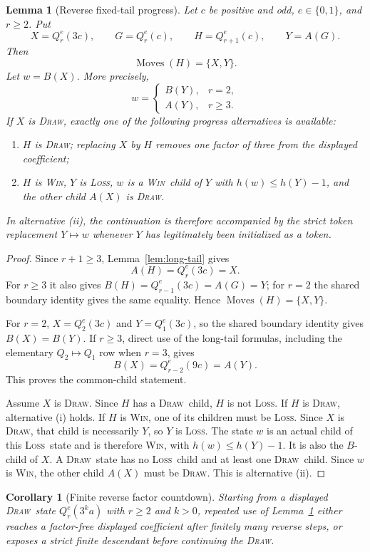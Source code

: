 \documentclass[11pt,a4paper]{article}
\newtheorem{lemma}[theorem]{Lemma}
\newtheorem{corollary}[theorem]{Corollary}
\theoremstyle{definition}
\theoremstyle{remark}
\newcommand{\WIN}{\textnormal{\textsc{Win}}}
\newcommand{\LOSS}{\textnormal{\textsc{Loss}}}
\newcommand{\DRAW}{\textnormal{\textsc{Draw}}}
\newcommand{\Moves}{\operatorname{Moves}}
\begin{document}
\begin{lemma}[Reverse fixed-tail progress]\label{lem:fixed-tail-progress}
Let $c$ be positive and odd, $e\in\{0,1\}$, and $r\ge2$.  Put
\[
 X=Q_r^e(3c),\qquad
 G=Q_r^e(c),\qquad
 H=Q_{r+1}^e(c),\qquad
 Y=A(G).
\]
Then
\[
 \Moves(H)=\{X,Y\}.
\]
Let $w=B(X)$.  More precisely,
\[
 w=\begin{cases}
     B(Y),&r=2,\\
     A(Y),&r\ge3.
   \end{cases}
\]
If $X$ is \DRAW, exactly one of the following progress alternatives is
available:
\begin{enumerate}[label=(\roman*)]
\item $H$ is \DRAW; replacing $X$ by $H$ removes one factor of three from
      the displayed coefficient;
\item $H$ is \WIN, $Y$ is \LOSS, $w$ is a \WIN\ child of $Y$ with
      $h(w)\le h(Y)-1$, and the other child $A(X)$ is \DRAW.
\end{enumerate}
In alternative (ii), the continuation is therefore accompanied by the
strict token replacement $Y\mapsto w$ whenever $Y$ has legitimately been
initialized as a token.
\end{lemma}

\begin{proof}
Since $r+1\ge3$, Lemma~\ref{lem:long-tail} gives
\[
 A(H)=Q_r^e(3c)=X.
\]
For $r\ge3$ it also gives
$B(H)=Q_{r-1}^e(3c)=A(G)=Y$; for $r=2$ the shared boundary identity gives
the same equality.  Hence $\Moves(H)=\{X,Y\}$.

For $r=2$, $X=Q_2^e(3c)$ and $Y=Q_1^e(3c)$, so the shared boundary identity
gives $B(X)=B(Y)$.  If $r\ge3$, direct use of the long-tail formulas,
including the elementary $Q_2\mapsto Q_1$ row when $r=3$, gives
\[
 B(X)=Q_{r-2}^e(9c)=A(Y).
\]
This proves the common-child statement.

Assume $X$ is \DRAW.  Since $H$ has a \DRAW\ child, $H$ is not
\LOSS.  If $H$ is \DRAW, alternative (i) holds.  If $H$ is \WIN, one
of its children must be \LOSS.  Since $X$ is \DRAW, that child is
necessarily $Y$, so $Y$ is \LOSS.
The state $w$ is an actual child of this \LOSS\ state and is therefore
\WIN, with $h(w)\le h(Y)-1$.  It is also the $B$-child of $X$.  A \DRAW\
state has no \LOSS\ child and at least one \DRAW\ child.  Since $w$ is
\WIN, the other child $A(X)$ must be \DRAW.  This is alternative (ii).
\end{proof}

\begin{corollary}[Finite reverse factor countdown]\label{cor:reverse-countdown}
Starting from a displayed \DRAW\ state $Q_r^e(3^k a)$ with $r\ge2$ and
$k>0$, repeated use of Lemma~\ref{lem:fixed-tail-progress} either reaches a
factor-free displayed coefficient after finitely many reverse steps, or
exposes a strict finite descendant before continuing the \DRAW.
\end{corollary}
\end{document}
